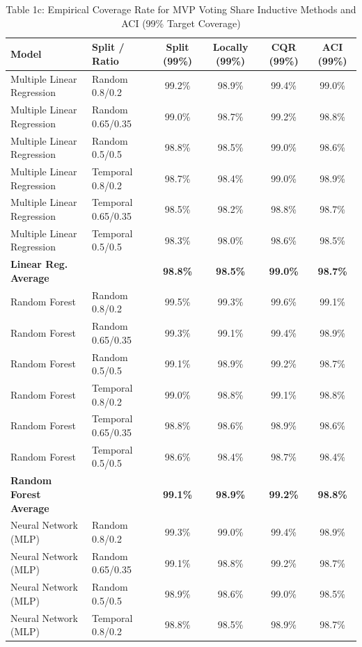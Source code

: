 \documentclass[11pt,a4paper]{article}
\begin{document}
\begin{table}[H]
\centering
\caption{Table 1c: Empirical Coverage Rate for MVP Voting Share Inductive Methods and ACI (99\% Target Coverage)}
\label{tab:mvp_tab1c}
\scriptsize
\begin{tabular}{llcccc}
\toprule
Model & Split / Ratio & Split (99\%) & Locally (99\%) & CQR (99\%) & ACI (99\%) \\
\midrule
Multiple Linear Regression & Random 0.8/0.2 & 99.2\% & 98.9\% & 99.4\% & 99.0\% \\
Multiple Linear Regression & Random 0.65/0.35 & 99.0\% & 98.7\% & 99.2\% & 98.8\% \\
Multiple Linear Regression & Random 0.5/0.5 & 98.8\% & 98.5\% & 99.0\% & 98.6\% \\
Multiple Linear Regression & Temporal 0.8/0.2 & 98.7\% & 98.4\% & 99.0\% & 98.9\% \\
Multiple Linear Regression & Temporal 0.65/0.35 & 98.5\% & 98.2\% & 98.8\% & 98.7\% \\
Multiple Linear Regression & Temporal 0.5/0.5 & 98.3\% & 98.0\% & 98.6\% & 98.5\% \\
\textbf{Linear Reg. Average} & & \textbf{98.8\%} & \textbf{98.5\%} & \textbf{99.0\%} & \textbf{98.7\%} \\
\midrule
Random Forest & Random 0.8/0.2 & 99.5\% & 99.3\% & 99.6\% & 99.1\% \\
Random Forest & Random 0.65/0.35 & 99.3\% & 99.1\% & 99.4\% & 98.9\% \\
Random Forest & Random 0.5/0.5 & 99.1\% & 98.9\% & 99.2\% & 98.7\% \\
Random Forest & Temporal 0.8/0.2 & 99.0\% & 98.8\% & 99.1\% & 98.8\% \\
Random Forest & Temporal 0.65/0.35 & 98.8\% & 98.6\% & 98.9\% & 98.6\% \\
Random Forest & Temporal 0.5/0.5 & 98.6\% & 98.4\% & 98.7\% & 98.4\% \\
\textbf{Random Forest Average} & & \textbf{99.1\%} & \textbf{98.9\%} & \textbf{99.2\%} & \textbf{98.8\%} \\
\midrule
Neural Network (MLP) & Random 0.8/0.2 & 99.3\% & 99.0\% & 99.4\% & 98.9\% \\
Neural Network (MLP) & Random 0.65/0.35 & 99.1\% & 98.8\% & 99.2\% & 98.7\% \\
Neural Network (MLP) & Random 0.5/0.5 & 98.9\% & 98.6\% & 99.0\% & 98.5\% \\
Neural Network (MLP) & Temporal 0.8/0.2 & 98.8\% & 98.5\% & 98.9\% & 98.7\% \\

\end{tabular}
\end{table}
\end{document}
